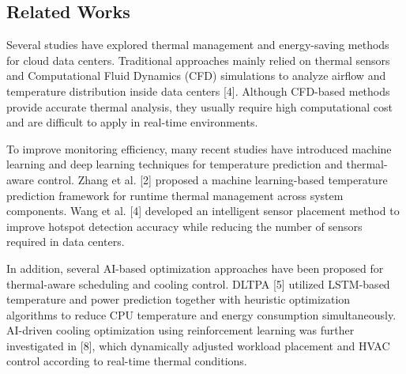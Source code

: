 \documentclass[conference]{IEEEtran}
\begin{document}


\subsection{Related Works}
Several studies have explored thermal management and energy-saving methods for cloud data centers. Traditional approaches mainly relied on thermal sensors and Computational Fluid Dynamics (CFD) simulations to analyze airflow and temperature distribution inside data centers [4]. Although CFD-based methods provide accurate thermal analysis, they usually require high computational cost and are difficult to apply in real-time environments.

To improve monitoring efficiency, many recent studies have introduced machine learning and deep learning techniques for temperature prediction and thermal-aware control. Zhang et al. [2] proposed a machine learning-based temperature prediction framework for runtime thermal management across system components. Wang et al. [4] developed an intelligent sensor placement method to improve hotspot detection accuracy while reducing the number of sensors required in data centers.

In addition, several AI-based optimization approaches have been proposed for thermal-aware scheduling and cooling control. DLTPA [5] utilized LSTM-based temperature and power prediction together with heuristic optimization algorithms to reduce CPU temperature and energy consumption simultaneously. AI-driven cooling optimization using reinforcement learning was further investigated in [8], which dynamically adjusted workload placement and HVAC control according to real-time thermal conditions.
\end{document}
